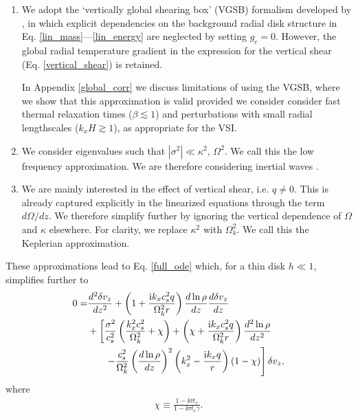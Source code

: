 \begin{enumerate}
  
\item  We adopt the  `vertically global shearing box' (VGSB) formalism 
  developed by , in which explicit dependencies on the
  background radial disk structure in 
  Eq. \ref{lin_mass}---\ref{lin_energy} are neglected by setting
  $\hat{g}_c=0$. However, the global radial temperature 
  gradient in the expression for the 
  vertical shear (Eq. \ref{vertical_shear}) is retained. 

  In Appendix \ref{global_corr}  we discuss limitations of using
  the VGSB, where we show that this approximation is valid provided we 
  consider consider fast thermal relaxation times
  ($\beta\lesssim 1$) and perturbations with small radial lengthscales
  ($k_xH\gtrsim 1$), as appropriate for the VSI.  
 
  
\item We consider eigenvalues such that
  $|\sigma^2|\ll \kappa^2,\,\Omega^2$. We call this the low frequency
  approximation. We are therefore considering inertial waves
  .  

\item We are mainly interested in the effect of vertical shear, i.e. $q\neq
  0$. This is already captured explicitly in the linearized equations through
  the term $d\Omega/dz$. We therefore simplify 
  further by ignoring the vertical dependence of $\Omega$ and $\kappa$
  elsewhere. For clarity, we replace $\kappa^2$ with
  $\Omega_k^2$. We call this the Keplerian approximation. 
  
\end{enumerate}

These approximations lead to Eq. \ref{full_ode} which, for a thin disk
$h\ll 1$, simplifies further to  
\begin{align}
  0 =& \frac{d^2\delta v_z}{dz^2} + \left(1 + \frac{\mathrm{i} k_x c_s^2
      q}{\Omega_k^2r}\right)\frac{d\ln\rho}{dz}\frac{d\delta
    v_z}{dz} \notag\\
  &+ \left[\frac{\sigma^2}{c_s^2}\left(\frac{k_x^2c_s^2}{\Omega_k^2} +
      \chi\right) + \left(\chi + \frac{\mathrm{i} k_x c_s^2
        q}{\Omega_k^2r}\right)\frac{d^2\ln\rho}{dz^2}\right. \notag\\
  &\phantom{+=}\left.-
    \frac{c_s^2}{\Omega_k^2}\left(\frac{d\ln\rho}{dz}\right)^2\left(k_x^2 -
      \frac{\mathrm{i} k_x q}{r}\right)
    \left(1-\chi\right) 
  \right]\delta v_z,\label{vertiso_gov}
\end{align}
where
\begin{align}
  \chi \equiv \frac{1-\ii\sigma t_c}{1-\ii\sigma t_c\gamma}.
\end{align}


